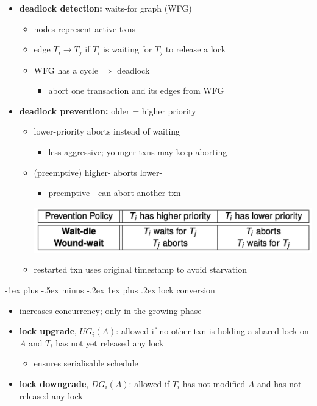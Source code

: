 \documentclass[10pt, landscape]{article}
\makeatletter
\renewcommand{\subsubsection}{\@startsection{subsubsection}{3}{0mm}%
  {-1ex plus -.5ex minus -.2ex}%
  {1ex plus .2ex}%
{\normalfont\small\bfseries}}%
\makeatother
\begin{document}
\begin{multicols*}{4}
  \begin{itemize}
    \item \textbf{deadlock detection:} waits-for graph (WFG)
      \begin{itemize}
        \item nodes represent active txns
        \item edge $T_i \to T_j$ if $T_i$ is waiting for $T_j$ to release a lock
        \item WFG has a cycle $\Rightarrow$ deadlock
          \begin{itemize}
            \item abort one transaction and its edges from WFG
          \end{itemize}
      \end{itemize}
    \item \textbf{deadlock prevention:} older = higher priority
      \begin{itemize}
        \item {} lower-priority aborts instead of waiting
          \begin{itemize}
            \item less aggressive; younger txns may keep aborting
          \end{itemize}
        \item {} (preemptive) higher- aborts lower-
          \begin{itemize}
            \item preemptive - can abort another txn
          \end{itemize}
          \includegraphics[width=0.95\linewidth]{cs3223-deadlock-prevention-policies} 
        \item restarted txn uses original timestamp to avoid starvation
      \end{itemize}
  \end{itemize}

  \subsubsection{lock conversion}

  \begin{itemize}
    \item increases concurrency; only in the growing phase
    \item \textbf{lock upgrade}, $UG_i(A)$: allowed if no other txn is holding a shared lock on $A$ and $T_i$ has not yet released any lock
      \begin{itemize}
        \item ensures serialisable schedule
      \end{itemize}
    \item \textbf{lock downgrade}, $DG_i(A)$: allowed if $T_i$ has not modified $A$ and has not released any lock
  \end{itemize}


\end{multicols*}
\end{document}
